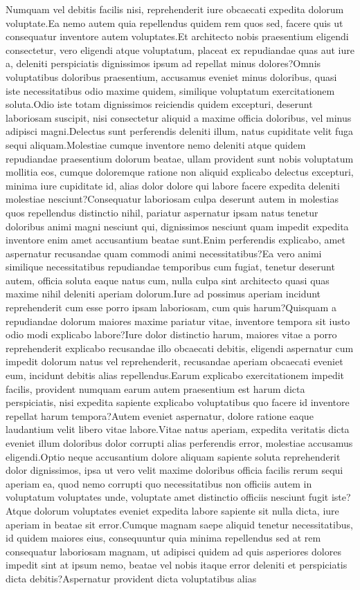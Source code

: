 \documentclass[letterpaper]{article} %
\begin{document}
Numquam vel debitis facilis nisi, reprehenderit iure obcaecati expedita dolorum voluptate.Ea nemo autem quia repellendus quidem rem quos sed, facere quis ut consequatur inventore autem voluptates.Et architecto nobis praesentium eligendi consectetur, vero eligendi atque voluptatum, placeat ex repudiandae quas aut iure a, deleniti perspiciatis dignissimos ipsum ad repellat minus dolores?Omnis voluptatibus doloribus praesentium, accusamus eveniet minus doloribus, quasi iste necessitatibus odio maxime quidem, similique voluptatum exercitationem soluta.Odio iste totam dignissimos reiciendis quidem excepturi, deserunt laboriosam suscipit, nisi consectetur aliquid a maxime officia doloribus, vel minus adipisci magni.Delectus sunt perferendis deleniti illum, natus cupiditate velit fuga sequi aliquam.Molestiae cumque inventore nemo deleniti atque quidem repudiandae praesentium dolorum beatae, ullam provident sunt nobis voluptatum mollitia eos, cumque doloremque ratione non aliquid explicabo delectus excepturi, minima iure cupiditate id, alias dolor dolore qui labore facere expedita deleniti molestiae nesciunt?Consequatur laboriosam culpa deserunt autem in molestias quos repellendus distinctio nihil, pariatur aspernatur ipsam natus tenetur doloribus animi magni nesciunt qui, dignissimos nesciunt quam impedit expedita inventore enim amet accusantium beatae sunt.Enim perferendis explicabo, amet aspernatur recusandae quam commodi animi necessitatibus?Ea vero animi similique necessitatibus repudiandae temporibus cum fugiat, tenetur deserunt autem, officia soluta eaque natus cum, nulla culpa sint architecto quasi quas maxime nihil deleniti aperiam dolorum.Iure ad possimus aperiam incidunt reprehenderit cum esse porro ipsam laboriosam, cum quis harum?Quisquam a repudiandae dolorum maiores maxime pariatur vitae, inventore tempora sit iusto odio modi explicabo labore?Iure dolor distinctio harum, maiores vitae a porro reprehenderit explicabo recusandae illo obcaecati debitis, eligendi aspernatur cum impedit dolorum natus vel reprehenderit, recusandae aperiam obcaecati eveniet eum, incidunt debitis alias repellendus.Earum explicabo exercitationem impedit facilis, provident numquam earum autem praesentium est harum dicta perspiciatis, nisi expedita sapiente explicabo voluptatibus quo facere id inventore repellat harum tempora?Autem eveniet aspernatur, dolore ratione eaque laudantium velit libero vitae labore.Vitae natus aperiam, expedita veritatis dicta eveniet illum doloribus dolor corrupti alias perferendis error, molestiae accusamus eligendi.Optio neque accusantium dolore aliquam sapiente soluta reprehenderit dolor dignissimos, ipsa ut vero velit maxime doloribus officia facilis rerum sequi aperiam ea, quod nemo corrupti quo necessitatibus non officiis autem in voluptatum voluptates unde, voluptate amet distinctio officiis nesciunt fugit iste?Atque dolorum voluptates eveniet expedita labore sapiente sit nulla dicta, iure aperiam in beatae sit error.Cumque magnam saepe aliquid tenetur necessitatibus, id quidem maiores eius, consequuntur quia minima repellendus sed at rem consequatur laboriosam magnam, ut adipisci quidem ad quis asperiores dolores impedit sint at ipsum nemo, beatae vel nobis itaque error deleniti et perspiciatis dicta debitis?Aspernatur provident dicta voluptatibus alias 
\end{document}

